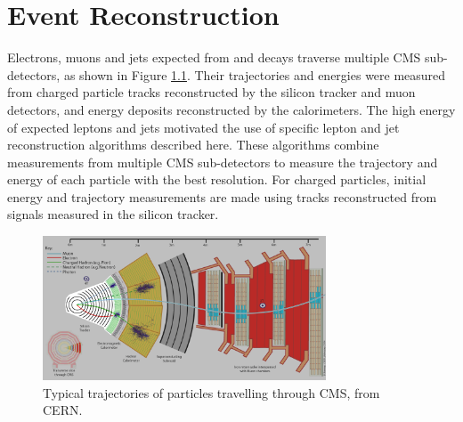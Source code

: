 \chapter{Event Reconstruction}
\label{sec:reco_chapter}

Electrons, muons and jets expected from \WR and \nul decays traverse multiple CMS sub-detectors, as shown in 
Figure \ref{fig:particleTrajectories}.  Their trajectories and energies were measured from charged particle tracks 
reconstructed by the silicon tracker and muon detectors, and energy deposits reconstructed by the calorimeters.  The 
high energy of expected leptons and jets motivated the use of specific lepton and jet reconstruction algorithms 
described here.  These algorithms combine measurements from multiple CMS sub-detectors to measure the trajectory 
and energy of each particle with the best resolution.  For charged particles, initial energy and trajectory 
measurements are made using tracks reconstructed from signals measured in the silicon tracker.

\begin{figure}[h]
	\centering
	\includegraphics[width=0.75\textwidth]{figures/flowOfParticlesThroughCMS.png}
	\caption{Typical trajectories of particles travelling through CMS, from CERN.}
	\label{fig:particleTrajectories}
\end{figure}


